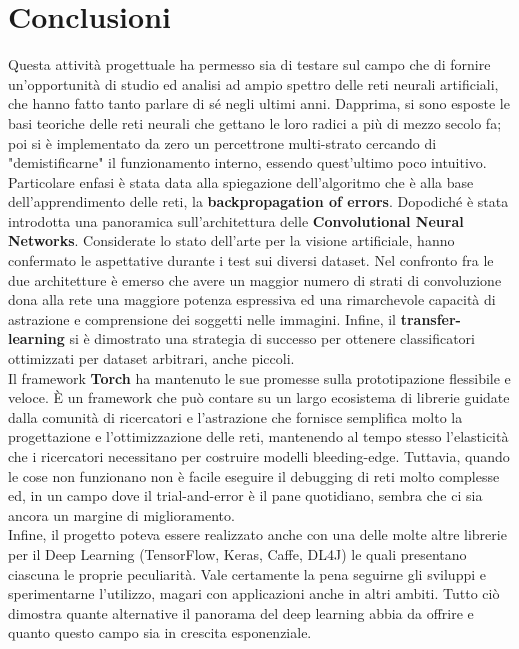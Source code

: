 \chapter{Conclusioni} 
Questa attività progettuale ha permesso sia di testare sul campo che di fornire un'opportunità di studio ed analisi ad ampio spettro delle reti neurali artificiali, che hanno fatto tanto parlare di sé negli ultimi anni. Dapprima, si sono esposte le basi teoriche delle reti neurali che gettano le loro radici a più di mezzo secolo fa; poi si è implementato da zero un percettrone multi-strato cercando di "demistificarne" il funzionamento interno, essendo quest'ultimo poco intuitivo. Particolare enfasi è stata data alla spiegazione dell'algoritmo che è alla base dell'apprendimento delle reti, la \textbf{backpropagation of errors}. Dopodiché è stata introdotta una panoramica sull'architettura delle \textbf{Convolutional Neural Networks}. Considerate lo stato dell'arte per la visione artificiale, hanno confermato le aspettative durante i test sui diversi dataset. Nel confronto fra le due architetture è emerso che avere un maggior numero di strati di convoluzione dona alla rete una maggiore potenza espressiva ed una rimarchevole capacità di astrazione e comprensione dei soggetti nelle immagini. Infine, il \textbf{transfer-learning} si è dimostrato una strategia di successo per ottenere classificatori ottimizzati per dataset arbitrari, anche piccoli. 
\\
Il framework \textbf{Torch} ha mantenuto le sue promesse sulla prototipazione flessibile e veloce. È un framework che può contare su un largo ecosistema di librerie guidate dalla comunità di ricercatori e l'astrazione che fornisce semplifica molto la progettazione e l'ottimizzazione delle reti, mantenendo al tempo stesso l'elasticità che i ricercatori necessitano per costruire modelli bleeding-edge. Tuttavia, quando le cose non funzionano non è facile eseguire il debugging di reti molto complesse ed, in un campo dove il trial-and-error è il pane quotidiano, sembra che ci sia ancora un margine di miglioramento.  \\
Infine, il progetto poteva essere realizzato anche con una delle molte altre librerie per il Deep Learning (TensorFlow, Keras, Caffe, DL4J) le quali presentano ciascuna le proprie peculiarità. Vale certamente la pena seguirne gli sviluppi e sperimentarne l'utilizzo, magari con applicazioni anche in altri ambiti. Tutto ciò dimostra quante alternative il panorama del deep learning abbia da offrire e quanto questo campo sia in crescita esponenziale.








